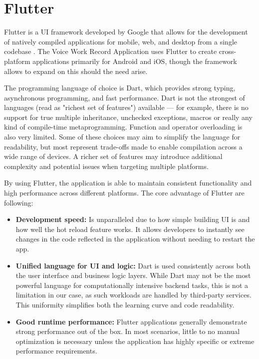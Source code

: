 \documentclass[
  digital,     %
  oneside,     %
  nosansbold,  %
  nocolorbold, %
  lof,         %
  lot,         %
]{fithesis4}
\begin{document}
\section{Flutter}
Flutter is a \gls{UI} framework developed by Google that allows for the development of natively compiled applications for mobile, web, and desktop from a single codebase \cite{flutterGithub}. The Voice Work Record Application uses Flutter to create cross-platform applications primarily for Android and \gls{iOS}, though the framework allows to expand on this should the need arise.

The programming language of choice is Dart, which provides strong typing, asynchronous programming, and fast performance. Dart is not the strongest of languages (read as "richest set of features") available --- for example, there is no support for true multiple inheritance, unchecked exceptions, macros or really any kind of compile-time metaprogramming. Function and operator overloading is also very limited. Some of these choices may aim to simplify the language for readability, but most represent trade-offs made to enable compilation across a wide range of devices. A richer set of features may introduce additional complexity and potential issues when targeting multiple platforms.

By using Flutter, the application is able to maintain consistent functionality and high performance across different platforms. The core advantage of Flutter are following:

\begin{itemize}
    \item \textbf{Development speed:} Is unparalleled due to how simple building \gls{UI} is and how well the hot reload feature works. It allows developers to instantly see changes in the code reflected in the application without needing to restart the app.
    \item \textbf{Unified language for \gls{UI} and logic:} Dart is used consistently across both the user interface and business logic layers. While Dart may not be the most powerful language for computationally intensive backend tasks, this is not a limitation in our case, as such workloads are handled by third-party services. This uniformity simplifies both the learning curve and code readability.
    \item \textbf{Good runtime performance:} Flutter applications generally demonstrate strong performance out of the box. In most scenarios, little to no manual optimization is necessary unless the application has highly specific or extreme performance requirements.
\end{itemize}
\end{document}
